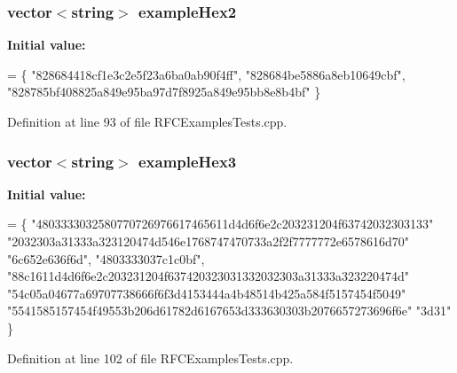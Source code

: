 \subsubsection[{example\+Hex2}]{\setlength{\rightskip}{0pt plus 5cm}vector$<$string$>$ example\+Hex2}\label{RFCExamplesTests_8cpp_a7c0345f36fc99fd41fc778be41908df4}
{\bfseries Initial value\+:}
\begin{DoxyCode}
= \{
  \textcolor{stringliteral}{"828684418cf1e3c2e5f23a6ba0ab90f4ff"},
  \textcolor{stringliteral}{"828684be5886a8eb10649cbf"},
  \textcolor{stringliteral}{"828785bf408825a849e95ba97d7f8925a849e95bb8e8b4bf"}
\}
\end{DoxyCode}


Definition at line 93 of file R\+F\+C\+Examples\+Tests.\+cpp.

\subsubsection[{example\+Hex3}]{\setlength{\rightskip}{0pt plus 5cm}vector$<$string$>$ example\+Hex3}\label{RFCExamplesTests_8cpp_a72a9738a65427389003ae168f13ad7a7}
{\bfseries Initial value\+:}
\begin{DoxyCode}
= \{
  \textcolor{stringliteral}{"4803333032580770726976617465611d4d6f6e2c203231204f63742032303133"}
  \textcolor{stringliteral}{"2032303a31333a323120474d546e1768747470733a2f2f7777772e6578616d70"}
  \textcolor{stringliteral}{"6c652e636f6d"},
  \textcolor{stringliteral}{"4803333037c1c0bf"},
  \textcolor{stringliteral}{"88c1611d4d6f6e2c203231204f637420323031332032303a31333a323220474d"}
  \textcolor{stringliteral}{"54c05a04677a69707738666f6f3d4153444a4b48514b425a584f5157454f5049"}
  \textcolor{stringliteral}{"5541585157454f49553b206d61782d6167653d333630303b2076657273696f6e"}
  \textcolor{stringliteral}{"3d31"}
\}
\end{DoxyCode}


Definition at line 102 of file R\+F\+C\+Examples\+Tests.\+cpp.

